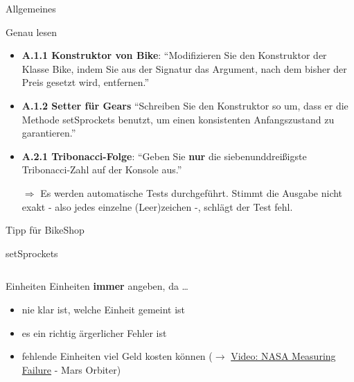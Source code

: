 \documentclass[usepdftitle=false,hyperref={pdfpagelabels=false}]{beamer}
\begin{document}
\begin{frame}{Allgemeines}
    \begin{block}{Genau lesen}
      \begin{itemize}[<+->]
        \item \textbf{A.1.1 Konstruktor von Bike}: "`Modifizieren Sie
              den Konstruktor der Klasse Bike, indem Sie aus der
              Signatur das Argument, nach dem bisher der Preis
              gesetzt wird, entfernen."'
        \item \textbf{A.1.2 Setter für Gears} "`Schreiben Sie den
              Konstruktor so um,  dass er die Methode setSprockets
              benutzt, um einen  konsistenten Anfangszustand zu
              garantieren."'
        \item \textbf{A.2.1 Tribonacci-Folge}: "`Geben Sie \textbf{nur} die
              siebenunddreißigste Tribonacci-Zahl auf der Konsole
              aus."'
        \item[$\Rightarrow$] Es werden automatische Tests durchgeführt.
              Stimmt die Ausgabe nicht exakt - also jedes einzelne
              (Leer)zeichen -, schlägt der Test fehl.
      \end{itemize}
    \end{block}
\end{frame}

\begin{frame}{Tipp für BikeShop}
\end{frame}

\begin{frame}{setSprockets}
    \inputminted[linenos=false, numbersep=5pt, tabsize=4, fontsize=\tiny, label=Gears.java, frame=lines, firstline=25, lastline=51]{java}{Gears.java}
\end{frame}

\begin{frame}{Einheiten}
  Einheiten \textbf{immer} angeben, da \dots
  \begin{itemize}[<+->]
    \item nie klar ist, welche Einheit gemeint ist
    \item es ein richtig ärgerlicher Fehler ist
    \item fehlende Einheiten viel Geld kosten können ($\rightarrow$ \href{http://www.youtube.com/watch?v=q2L5\_swAT5A}{Video: NASA Measuring Failure} - Mars Orbiter)
  \end{itemize}
\end{frame}
\end{document}
